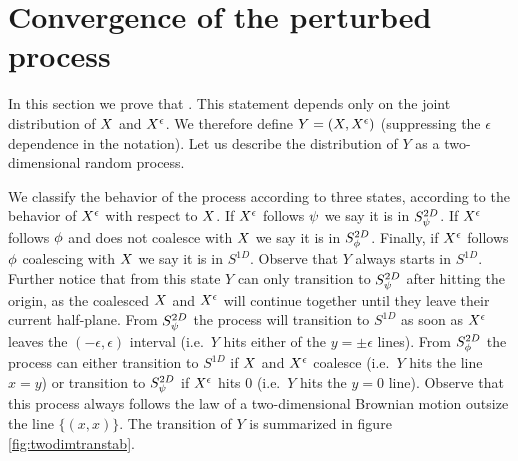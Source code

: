 {
\section{Convergence of the perturbed process}
\label{sec:proof-of-lem:resamplede-to-sampled}

\newcommand{\statenoweb}{S^{2D}_{\bmweb}}
\newcommand{\statewebapart}{S^{2D}_{\webnoargs}}
\newcommand{\statewebtogether}{S^{1D}}
\newcommand{\twodim}{Y}

In this section we prove that
\statementoflemresampledetosampled{}.  This statement depends only on the
joint distribution of $X$ and $X^{\epsilon}$.
We therefore define $\twodim=(\sampled, \resamplede)$ (suppressing
the $\epsilon$ dependence in the notation). Let us describe the distribution of
$\twodim$
 as a two-dimensional random process.

We classify the behavior of the process according to three states, according to
the behavior of $X^{\epsilon}$ with respect to $X$. If $X^{\epsilon}$ follows
$\psi$ we say it is in $\statenoweb$. If $X^{\epsilon}$ follows $\phi$
and does not coalesce with $X$ we say it is in $\statewebapart$. Finally,
if $X^{\epsilon}$ follows $\phi$ coalescing with $X$ we say it is in
$\statewebtogether$. Observe that $\twodim$ always starts
in $\statewebtogether$. Further notice that from this state $\twodim$
can only transition to $\statenoweb$ after hitting the origin, as the coalesced
$X$ and $X^{\epsilon}$ will continue together until they leave their
current half-plane. From $\statenoweb$ the process will transition to
$\statewebtogether$ as soon as $X^{\epsilon}$ leaves the $(-\epsilon,\epsilon)$
interval (i.e.\ $\twodim$ hits either of the $y=\pm\epsilon$ lines). From
$\statewebapart$ the process can either transition to $\statewebtogether$
if $X$ and $X^{\epsilon}$ coalesce (i.e.\ $\twodim$ hits the line $x=y$)
or transition to $\statenoweb$ if $X^{\epsilon}$ hits $0$ (i.e.\ $\twodim$ hits
the $y=0$ line). Observe that this process always follows the law of a two-dimensional
Brownian motion outsize the line $\{(x,x)\}$. The transition of $\twodim$ is
summarized in figure
\ref{fig:twodimtranstab}.

}
